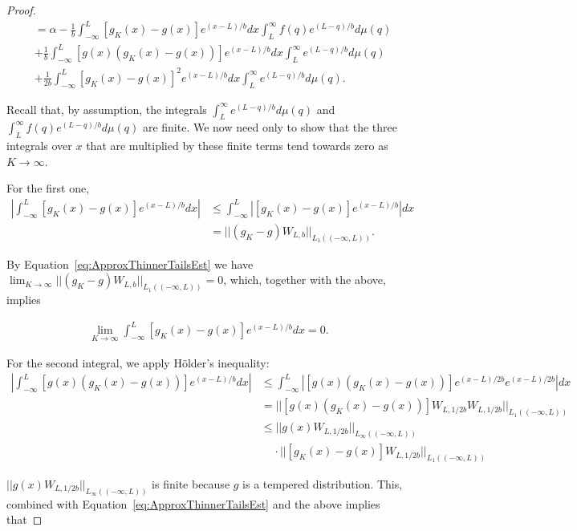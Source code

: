 \documentclass[11pt]{article}
\begin{document}
\begin{proof}
\begin{align}
    &= \alpha - \frac{1}{b}\int_{-\infty}^L \left[g_K(x) - g(x) \right]
    e^{(x-L)/b} dx \int_L^\infty f(q) e^{(L-q)/b} d\mu(q) \nonumber \\
    &+\frac{1}{b}\int_{-\infty}^L \left[g(x)(g_K(x) - g(x)) \right]
    e^{(x-L)/b} dx \int_L^\infty e^{(L-q)/b} d\mu(q) \nonumber \\
    &+ \frac{1}{2b} \int_{-\infty}^L \left[g_K(x) - g(x) \right]^2
    e^{(x-L)/b} dx \int_L^\infty e^{(L-q)/b} d\mu(q).\label{eq:approxErrFinalDecomp}
\end{align}


Recall that, by assumption, the integrals $\int_L^\infty e^{(L-q)/b} d\mu(q)$ and $\int_L^\infty f(q) e^{(L-q)/b} d\mu(q)$ are finite. We now need only to show that the three integrals over $x$ that are multiplied by these finite terms tend towards zero as $K \to \infty$.

For the first one, 
\begin{align}\label{eq:}
    |\int_{-\infty}^L \left[g_K(x) - g(x) \right]e^{(x-L)/b} dx| 
    &\leq \int_{-\infty}^L |\left[g_K(x) - g(x) \right]e^{(x-L)/b}| dx \\
    &= ||(g_K - g)W_{L,b}||_{L_1((-\infty,L))}.
\end{align}

By Equation~\ref{eq:ApproxThinnerTailsEst} we have $\lim_{K \to \infty} ||(g_K - g)W_{L,b}||_{L_1((-\infty,L))} = 0$, which, together with the above, implies

\begin{align} \label{eq:ApproxErrDecompLim1}
     \lim_{K \to \infty} \int_{-\infty}^L \left[g_K(x) - g(x) \right]e^{(x-L)/b} dx = 0.
\end{align}


For the second integral, we apply H\"older's inequality:
\begin{align}
    |\int_{-\infty}^L \left[g(x)(g_K(x) - g(x)) \right] e^{(x-L)/b} dx|
    &\leq \int_{-\infty}^L |\left[g(x)(g_K(x) - g(x)) \right] e^{(x-L)/2b}e^{(x-L)/2b}| dx \\
    &= ||\left[g(x)(g_K(x) - g(x)) \right]W_{L,1/2b}W_{L,1/2b}||_{L_1((-\infty,L))} \\
    &\leq ||g(x)W_{L,1/2b}||_{L_\infty((-\infty,L))} \\
    &\;\;\;\;\cdot||\left[g_K(x) - g(x) \right]W_{L,1/2b}||_{L_1((-\infty,L))}
\end{align}

$||g(x)W_{L,1/2b}||_{L_\infty((-\infty,L))}$ is finite because $g$ is a tempered distribution. This, combined with Equation~\ref{eq:ApproxThinnerTailsEst} and the above implies that


\end{proof}
\end{document}
